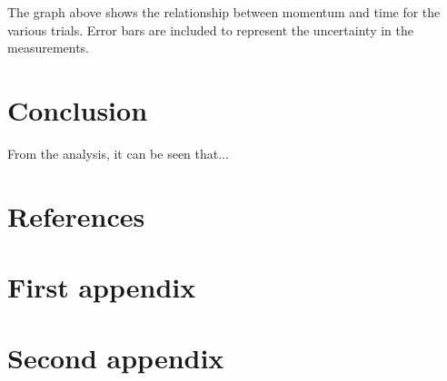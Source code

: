 \documentclass[12pt]{article}
\begin{document}
The graph above shows the relationship between momentum and time for the various trials. Error bars are included to represent the uncertainty in the measurements.

\section{Conclusion}

From the analysis, it can be seen that...

\section{References}




\appendix  
\clearpage
\addappheadtotoc 
\appendixpage 

\section{First appendix}

\lipsum[2]

\section{Second appendix}

\lipsum[1]
\end{document}
